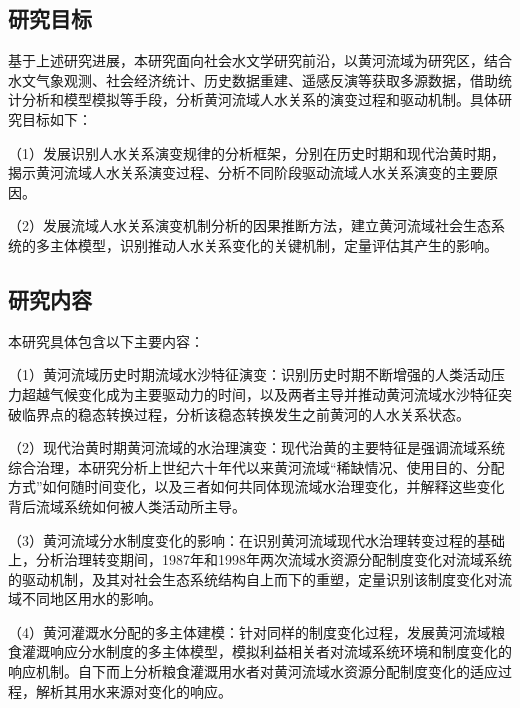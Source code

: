 
\subsection{研究目标}
基于上述研究进展，本研究面向社会水文学研究前沿，以黄河流域为研究区，结合水文气象观测、社会经济统计、历史数据重建、遥感反演等获取多源数据，借助统计分析和模型模拟等手段，分析黄河流域人\textendash{}水关系的演变过程和驱动机制。具体研究目标如下：

（1）发展识别人\textendash{}水关系演变规律的分析框架，分别在历史时期和现代治黄时期，揭示黄河流域人\textendash{}水关系演变过程、分析不同阶段驱动流域人\textendash{}水关系演变的主要原因。

（2）发展流域人\textendash{}水关系演变机制分析的因果推断方法，建立黄河流域社会\textendash{}生态系统的多主体模型，识别推动人\textendash{}水关系变化的关键机制，定量评估其产生的影响。


\subsection{研究内容}

本研究具体包含以下主要内容：

（1）黄河流域历史时期流域水沙特征演变：识别历史时期不断增强的人类活动压力超越气候变化成为主要驱动力的时间，以及两者主导并推动黄河流域水沙特征突破临界点的稳态转换过程，分析该稳态转换发生之前黄河的人\textendash{}水关系状态。

（2）现代治黄时期黄河流域的水治理演变：现代治黄的主要特征是强调流域系统综合治理，本研究分析上世纪六十年代以来黄河流域“稀缺情况、使用目的、分配方式”如何随时间变化，以及三者如何共同体现流域水治理变化，并解释这些变化背后流域系统如何被人类活动所主导。

（3）黄河流域分水制度变化的影响：在识别黄河流域现代水治理转变过程的基础上，分析治理转变期间，1987年和1998年两次流域水资源分配制度变化对流域系统的驱动机制，及其对社会\textendash{}生态系统结构自上而下的重塑，定量识别该制度变化对流域不同地区用水的影响。

（4）黄河灌溉水分配的多主体建模：针对同样的制度变化过程，发展黄河流域粮食灌溉响应分水制度的多主体模型，模拟利益相关者对流域系统环境和制度变化的响应机制。自下而上分析粮食灌溉用水者对黄河流域水资源分配制度变化的适应过程，解析其用水来源对变化的响应。

